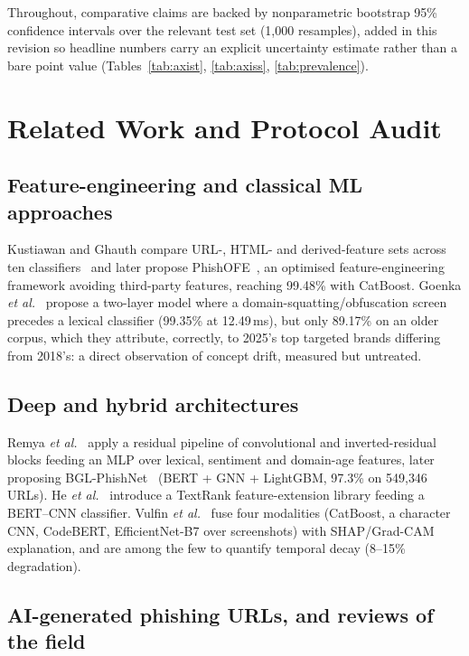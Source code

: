 \documentclass[conference]{IEEEtran}
\begin{document}
Throughout, comparative claims are backed by nonparametric bootstrap 95\%
confidence intervals over the relevant test set (1{,}000 resamples),
added in this revision so headline numbers carry an explicit uncertainty
estimate rather than a bare point value (Tables~\ref{tab:axist},
\ref{tab:axiss}, \ref{tab:prevalence}).

\section{Related Work and Protocol Audit}

\subsection{Feature-engineering and classical ML approaches}

Kustiawan and Ghauth compare URL-, HTML- and derived-feature sets across
ten classifiers~\cite{kustiawan2025feateng} and later propose
PhishOFE~\cite{kustiawan2025phishofe}, an optimised feature-engineering
framework avoiding third-party features, reaching 99.48\% with CatBoost.
Goenka \emph{et al.}~\cite{goenka2025layered} propose a two-layer model
where a domain-squatting/obfuscation screen precedes a lexical classifier
(99.35\% at 12.49\,ms), but only 89.17\% on an older corpus, which they
attribute, correctly, to 2025's top targeted brands differing from 2018's:
a direct observation of concept drift, measured but untreated.

\subsection{Deep and hybrid architectures}

Remya \emph{et al.}~\cite{remya2024resmlp} apply a residual pipeline of
convolutional and inverted-residual blocks feeding an MLP over lexical,
sentiment and domain-age features, later proposing
BGL-PhishNet~\cite{remya2025bgl} (BERT + GNN + LightGBM, 97.3\% on
549{,}346 URLs). He \emph{et al.}~\cite{he2024featext} introduce a
TextRank feature-extension library feeding a BERT--CNN classifier.
Vulfin \emph{et al.}~\cite{vulfin2026multimodal} fuse four modalities
(CatBoost, a character CNN, CodeBERT, EfficientNet-B7 over screenshots)
with SHAP/Grad-CAM explanation, and are among the few to quantify
temporal decay (8--15\% degradation).

\subsection{AI-generated phishing URLs, and reviews of the field}
\end{document}
